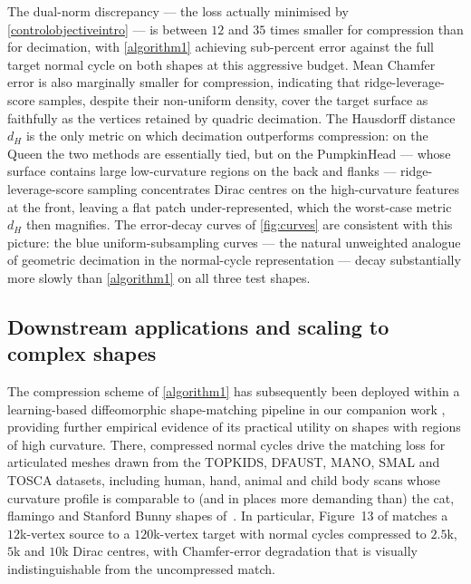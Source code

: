\documentclass[sn-mathphys-num]{sn-jnl}%
\theoremstyle{thmstyleone}%
\theoremstyle{thmstyletwo}%
\theoremstyle{thmstylethree}%
\numberwithin{remark}{section}
\numberwithin{definition}{section}
\numberwithin{equation}{section}
\numberwithin{theorem}{section}
\begin{document}
The dual-norm discrepancy --- the loss actually minimised by
\cref{controlobjectiveintro} --- is between $12$ and $35$ times smaller for
compression than for decimation, with \cref{algorithm1} achieving 
sub-percent error against the full target normal cycle on both shapes at
this aggressive budget. Mean Chamfer error is also marginally smaller for
compression, indicating that ridge-leverage-score samples, despite their
non-uniform density, cover the target surface as faithfully as the vertices
retained by quadric decimation. The Hausdorff distance $d_{H}$ is the only
metric on which decimation outperforms compression: on the Queen the two
methods are essentially tied, but on the PumpkinHead --- whose surface
contains large low-curvature regions on the back and flanks ---
ridge-leverage-score sampling concentrates Dirac centres on the high-curvature
features at the front, leaving a flat patch under-represented, which the
 worst-case metric $d_{H}$ then magnifies.
The error-decay curves of
\cref{fig:curves} are consistent with this picture: the blue uniform-subsampling
curves --- the natural unweighted analogue of geometric decimation in the
normal-cycle representation --- decay substantially more slowly than
\cref{algorithm1} on all three test shapes.

\subsection{Downstream applications and scaling to complex shapes}\label{downstreamsec}
The compression scheme of \cref{algorithm1} has subsequently been
deployed within a learning-based diffeomorphic shape-matching pipeline
in our companion work \cite{CurvatureEnthusiasm}, providing further
empirical evidence of its practical utility on shapes with regions of
high curvature. There, compressed normal cycles drive the matching
loss for articulated meshes drawn from the TOPKIDS, DFAUST, MANO, SMAL and
TOSCA datasets, including human, hand, animal and child body
scans whose curvature profile is comparable to (and in places more
demanding than) the cat, flamingo and Stanford Bunny shapes
of~\cite{NCpaper, SparseNystromCurrVar}. In particular, Figure~13 of
\cite{CurvatureEnthusiasm} matches a $12$k-vertex source to a $120$k-vertex
target with normal cycles compressed to $2.5$k, $5$k and $10$k Dirac
centres, with Chamfer-error degradation that is visually
indistinguishable from the uncompressed match.
\end{document}
